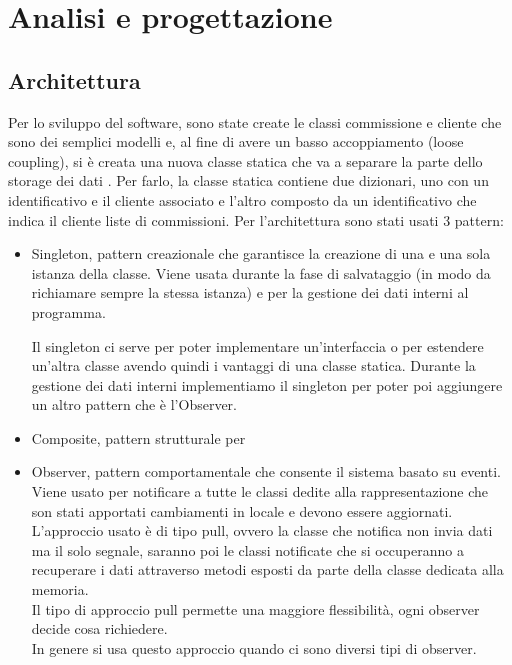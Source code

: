 \section{Analisi e progettazione}
\subsection{Architettura}

Per lo sviluppo del software, sono state create le classi commissione e cliente che sono dei semplici modelli
e, al fine di avere un basso accoppiamento (loose coupling), si è creata una nuova classe statica che va a 
separare la parte dello storage dei dati  . 
Per farlo, la classe statica contiene due dizionari, uno con un identificativo e il cliente associato e l'altro composto da
 un identificativo che indica il cliente liste di commissioni.
 \vspace{0.5cm}
 Per l'architettura sono stati usati 3 pattern:
\begin{itemize}
    \item Singleton, pattern creazionale che garantisce la creazione di una e una sola istanza della classe.  
    Viene usata durante la fase di salvataggio (in modo da richiamare sempre la stessa istanza) e per la gestione
    dei dati interni al programma. 

    Il singleton ci serve per poter implementare un'interfaccia o per estendere un'altra classe avendo quindi i vantaggi di una classe statica.
    Durante la gestione dei dati interni implementiamo il singleton per poter poi aggiungere un altro pattern che è
    l'Observer. 
    \item Composite, pattern strutturale per 
    \item Observer, pattern comportamentale che consente il sistema basato su eventi. \\
    Viene usato per notificare a tutte le classi dedite alla rappresentazione che son 
    stati apportati cambiamenti in locale e devono essere aggiornati. L'approccio usato
    è di tipo pull, ovvero la classe che notifica non invia dati ma il solo segnale, saranno
    poi le classi notificate che si occuperanno a recuperare i dati attraverso metodi esposti
    da parte della classe dedicata alla memoria. \\
    Il tipo di approccio pull permette una maggiore flessibilità, ogni observer decide cosa 
    richiedere. \\
    In genere si usa questo approccio quando ci sono diversi tipi di observer.
\end{itemize}

